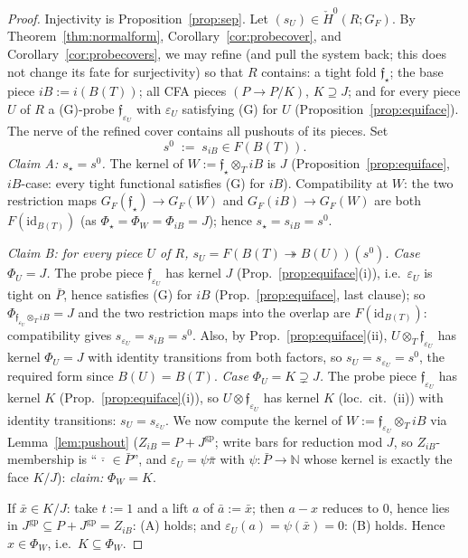 \documentclass[11pt]{article}
\theoremstyle{definition}
\newcommand{\gp}{\mathrm{gp}}
\newcommand{\HH}{\check{H}}
\begin{document}
\begin{proof}
Injectivity is Proposition~\ref{prop:sep}. Let
$(s_U)\in\HH^0(R;G_F)$. By Theorem~\ref{thm:normalform},
Corollary~\ref{cor:probecover}, and
Corollary~\ref{cor:probecovers}, we may refine (and pull the system
back; this does not change its fate for surjectivity) so that $R$
contains: a tight fold $\mathfrak f_\star$; the base piece
$iB:=i(B(T))$; all CFA pieces $(P\to P/K)$, $K\supseteq J$; and for
every piece $U$ of $R$ a (G)-probe $\mathfrak f_{\varepsilon_U}$
with $\varepsilon_U$ satisfying (G) for $U$
(Proposition~\ref{prop:equiface}). The nerve of the refined cover
contains all pushouts of its pieces. Set
\[
s^0\;:=\;s_{iB}\in F(B(T)).
\]
\emph{Claim A: $s_\star=s^0$.} The kernel of
$W:=\mathfrak f_\star\otimes_T iB$ is $J$
(Proposition~\ref{prop:equiface}, $iB$-case: every tight functional
satisfies (G) for $iB$). Compatibility at $W$: the two restriction
maps $G_F(\mathfrak f_\star)\to G_F(W)$ and $G_F(iB)\to G_F(W)$ are
both $F(\mathrm{id}_{B(T)})$ (as $\Phi_\star=\Phi_W=\Phi_{iB}=J$);
hence $s_\star=s_{iB}=s^0$.

\emph{Claim B: for every piece $U$ of $R$,
$s_U=F(B(T)\twoheadrightarrow B(U))(s^0)$.}
\emph{Case $\Phi_U=J$.} The probe piece $\mathfrak
f_{\varepsilon_U}$ has kernel $J$ (Prop.~\ref{prop:equiface}(i)),
i.e.\ $\varepsilon_U$ is tight on $\bar P$, hence satisfies (G) for
$iB$ (Prop.~\ref{prop:equiface}, last clause); so
$\Phi_{\mathfrak f_{\varepsilon_U}\otimes_T iB}=J$ and the two
restriction maps into the overlap are
$F(\mathrm{id}_{B(T)})$: compatibility gives
$s_{\varepsilon_U}=s_{iB}=s^0$. Also, by
Prop.~\ref{prop:equiface}(ii),
$U\otimes_T\mathfrak f_{\varepsilon_U}$ has kernel $\Phi_U=J$
with identity transitions from both factors, so
$s_U=s_{\varepsilon_U}=s^0$, the required form since
$B(U)=B(T)$.
\emph{Case $\Phi_U=K\supsetneq J$.} The probe piece
$\mathfrak f_{\varepsilon_U}$ has kernel $K$
(Prop.~\ref{prop:equiface}(i)), so
$U\otimes\mathfrak f_{\varepsilon_U}$ has kernel $K$
(loc.\ cit.\ (ii)) with identity transitions:
$s_U=s_{\varepsilon_U}$. We now compute the kernel of
$W:=\mathfrak f_{\varepsilon_U}\otimes_T iB$ via
Lemma~\ref{lem:pushout} ($Z_{iB}=P+J^{\gp}$; write bars for
reduction mod $J$, so $Z_{iB}$-membership is
``$\overline{\,\cdot\,}\in\bar P$'', and
$\varepsilon_U=\psi\bar\pi$ with $\psi:\bar P\to\mathbb N$ whose
kernel is exactly the face $K/J$):
\emph{claim:} $\Phi_W=K$.

If $\bar x\in K/J$: take $t:=1$ and a lift $a$ of $\bar a:=\bar x$;
then $a-x$ reduces to $0$, hence lies in $J^{\gp}\subseteq
P+J^{\gp}=Z_{iB}$: (A) holds; and
$\varepsilon_U(a)=\psi(\bar x)=0$: (B) holds. Hence
$x\in\Phi_W$, i.e.\ $K\subseteq\Phi_W$.


\end{proof}
\end{document}
